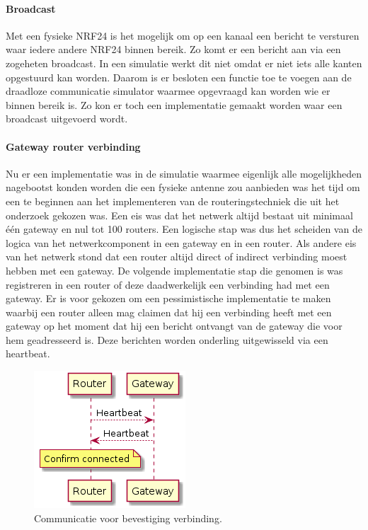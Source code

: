 \documentclass[a4paper, 11pt, oneside]{report}
\begin{document}
\paragraph{Broadcast}
Met een fysieke NRF24 is het mogelijk om op een kanaal een bericht te versturen waar iedere andere NRF24 binnen bereik.
Zo komt er een bericht aan via een zogeheten broadcast. 
In een simulatie werkt dit niet omdat er niet iets alle kanten opgestuurd kan worden.
Daarom is er besloten een functie toe te voegen aan de draadloze communicatie simulator waarmee opgevraagd kan worden wie er binnen bereik is. Zo kon er toch een implementatie gemaakt worden waar een broadcast uitgevoerd wordt.  
\paragraph{Gateway router verbinding}
Nu er een implementatie was in de simulatie waarmee eigenlijk alle mogelijkheden nagebootst konden worden die een fysieke antenne zou aanbieden was het tijd om een te beginnen aan het implementeren van de routeringstechniek die uit het onderzoek gekozen was.
Een eis was dat het netwerk altijd bestaat uit minimaal één gateway en nul tot 100 routers.
Een logische stap was dus het scheiden van de logica van het netwerkcomponent in een gateway en in een router.
Als andere eis van het netwerk stond dat een router altijd direct of indirect verbinding moest hebben met een gateway.
De volgende implementatie stap die genomen is was registreren in een router of deze daadwerkelijk een verbinding had met een gateway.
Er is voor gekozen om een pessimistische implementatie te maken waarbij een router alleen mag claimen dat hij een verbinding heeft met een gateway op het moment dat hij een bericht ontvangt van de gateway die voor hem geadresseerd is.
Deze berichten worden onderling uitgewisseld via een heartbeat. 

\begin{figure}[H]
	\begin{center}\includegraphics[width=0.2\linewidth]{Afbeeldingen/heartbeat.png}\end{center}
	\caption{Communicatie voor bevestiging verbinding.}
	\label{fig:bevestigingverbinding}
\end{figure}
\end{document}
